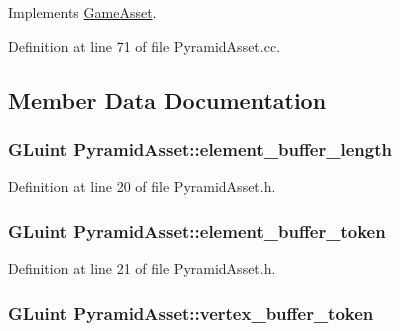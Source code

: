 Implements \hyperlink{class_game_asset_a961aa51ca0a9961fc584c0b5d5431300}{Game\+Asset}.



Definition at line 71 of file Pyramid\+Asset.\+cc.



\subsection{Member Data Documentation}
\hypertarget{class_pyramid_asset_a5566105859271b493eab3b5f9c02f866}{}
\subsubsection[{element\+\_\+buffer\+\_\+length}]{\setlength{\rightskip}{0pt plus 5cm}G\+Luint Pyramid\+Asset\+::element\+\_\+buffer\+\_\+length\hspace{0.3cm}{\ttfamily [private]}}\label{class_pyramid_asset_a5566105859271b493eab3b5f9c02f866}


Definition at line 20 of file Pyramid\+Asset.\+h.

\hypertarget{class_pyramid_asset_a6f7e2f50904d2941e33df8eb7f5f9c2d}{}
\subsubsection[{element\+\_\+buffer\+\_\+token}]{\setlength{\rightskip}{0pt plus 5cm}G\+Luint Pyramid\+Asset\+::element\+\_\+buffer\+\_\+token\hspace{0.3cm}{\ttfamily [private]}}\label{class_pyramid_asset_a6f7e2f50904d2941e33df8eb7f5f9c2d}


Definition at line 21 of file Pyramid\+Asset.\+h.

\hypertarget{class_pyramid_asset_a54d9cec42bc77d07a66e6c1cd55049b0}{}
\subsubsection[{vertex\+\_\+buffer\+\_\+token}]{\setlength{\rightskip}{0pt plus 5cm}G\+Luint Pyramid\+Asset\+::vertex\+\_\+buffer\+\_\+token\hspace{0.3cm}{\ttfamily [private]}}\label{class_pyramid_asset_a54d9cec42bc77d07a66e6c1cd55049b0}


